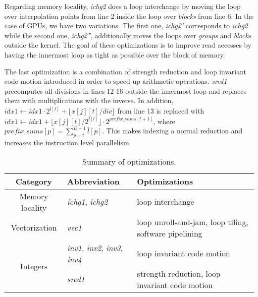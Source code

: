 Regarding memory locality, \textit{ichg2} does a loop interchange by moving the
loop over interpolation points from line 2 inside the loop over \textit{blocks}
from line 6. In the case of GPUs, we have two variations. The first one,
\textit{ichg2'} corresponds to \textit{ichg2} while the second one,
\textit{ichg2''}, additionally moves the loops over \textit{groups} and
\textit{blocks} outside the kernel. The goal of these optimizations is to
improve read accesses by having the innermost loop as tight as possible over the
block of memory.

The last optimization is a combination of strength reduction and loop invariant
code motion introduced in order to speed up arithmetic operations.
\textit{sred1} precomputes all divisions in lines 12-16 outside the innermost
loop and replaces them with multiplications with the inverse. In addition, $idx1
\leftarrow idx1 \cdot 2^{\bar{l}[t]} + \lfloor x[j][t] / div \rfloor$ from line
13 is replaced with $idx1 \leftarrow idx1 + \lfloor x[j][t] / 2^{\bar{l}[t]}
\rfloor \cdot 2^{\textit{prefix\_sums}[t + 1]}$, where $\textit{prefix\_sums}[p]
= \sum_{p=t}^{D-1}\bar{l}[p]$. This makes indexing a normal reduction and
increases the instruction level parallelism.

\begin{center}
\begin{table*}[t]
{\small
\hfill{}
\begin{tabular}{|c|l|l|}
  \hline
  \textbf{Category} & \textbf{Abbreviation} & \textbf{Optimizations} \\ 
  \hline
  Memory locality & \textit{ichg1}, \textit{ichg2} & loop interchange \\ 
  \hline
  Vectorization  & \textit{vec1} & loop unroll-and-jam, loop tiling, software pipelining \\ 
  \hline
  \multirow{2}{*}{Integers} & \textit{inv1}, \textit{inv2}, \textit{inv3}, \textit{inv4} & loop invariant code motion \\
  \cline{2-3}
  & \textit{sred1} & strength reduction, loop invariant code motion \\
  \hline
\end{tabular}}
\hfill{}
\caption{Summary of optimizations.}
\label{table:optimizations}
\end{table*}
\end{center}